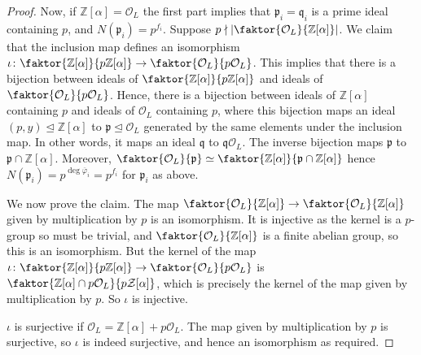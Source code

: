 \begin{proof}
    Now, if \( \mathbb Z[\alpha] = \mathcal O_L \) the first part implies that \( \mathfrak p_i = \mathfrak q_i \) is a prime ideal containing \( p \), and \( N(\mathfrak p_i) = p^{f_i} \).
    Suppose \( p \nmid \abs{\faktor{\mathcal O_L}{\mathbb Z[\alpha]}} \).
    We claim that the inclusion map defines an isomorphism \( \iota \colon \faktor{\mathbb Z[\alpha]}{p\mathbb Z[\alpha]} \to \faktor{\mathcal O_L}{p\mathcal O_L} \).
    This implies that there is a bijection between ideals of \( \faktor{\mathbb Z[\alpha]}{p\mathbb Z[\alpha]} \) and ideals of \( \faktor{\mathcal O_L}{p\mathcal O_L} \).
    Hence, there is a bijection between ideals of \( \mathbb Z[\alpha] \) containing \( p \) and ideals of \( \mathcal O_L \) containing \( p \), where this bijection maps an ideal \( (p, y) \trianglelefteq \mathbb Z[\alpha] \) to \( \mathfrak p \trianglelefteq \mathcal O_L \) generated by the same elements under the inclusion map.
    In other words, it maps an ideal \( \mathfrak q \) to \( \mathfrak q \mathcal O_L \).
    The inverse bijection maps \( \mathfrak p \) to \( \mathfrak p \cap \mathbb Z[\alpha] \).
    Moreover, \( \faktor{\mathcal O_L}{\mathfrak p} \simeq \faktor{\mathbb Z[\alpha]}{\mathfrak p \cap \mathbb Z[\alpha]} \) hence \( N(\mathfrak p_i) = p^{\deg \overline\varphi_i} = p^{f_i} \) for \( \mathfrak p_i \) as above.

    We now prove the claim.
    The map \( \faktor{\mathcal O_L}{\mathbb Z[\alpha]} \to \faktor{\mathcal O_L}{\mathbb Z[\alpha]} \) given by multiplication by \( p \) is an isomorphism.
    It is injective as the kernel is a \( p \)-group so must be trivial, and \( \faktor{\mathcal O_L}{\mathbb Z[\alpha]} \) is a finite abelian group, so this is an isomorphism.
    But the kernel of the map \( \iota \colon \faktor{\mathbb Z[\alpha]}{p\mathbb Z[\alpha]} \to \faktor{\mathcal O_L}{p\mathcal O_L} \) is \( \faktor{\mathbb Z[\alpha] \cap p \mathcal O_L}{p\mathcal Z[\alpha]} \), which is precisely the kernel of the map given by multiplication by \( p \).
    So \( \iota \) is injective.
    
    \( \iota \) is surjective if \( \mathcal O_L = \mathbb Z[\alpha] + p\mathcal O_L \).
    The map given by multiplication by \( p \) is surjective, so \( \iota \) is indeed surjective, and hence an isomorphism as required.


\end{proof}
